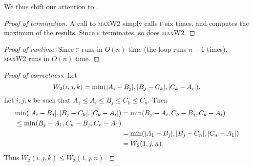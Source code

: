 \documentclass[12pt]{article}
\begin{document}
\begin{solution}
\begin{enumerate}[wide]
            We thus shift our attention to .
            \begin{proof}[Proof of termination]
                A call to \textsc{maxW2} simply calls \textsc{f} six times, and
                computes the maximum of the results.
                Since \textsc{f} terminates, so does \textsc{maxW2}.
            \end{proof}
            \begin{proof}[Proof of runtime]
                Since \textsc{f} runs in $O(n)$ time (the loop runs $n - 1$ times),
                \textsc{maxW2} runs in $O(n)$ time.
            \end{proof}
            \begin{proof}[Proof of correctness]
                Let \[
                    W_2(i, j, k) = \min(\abs{A_{i} - B_{j}}, \abs{B_{j} - C_{k}}, \abs{C_{k} - A_{i}}).
                \]
                Let $i, j, k$ be such that $A_1 \leq A_{i} \leq B_{j} \leq C_{k} \leq C_{n}$.
                Then
                \begin{align*}
                    \min(\abs{A_{i} - B_{j}}, \abs{B_{j} - C_{k}}, \abs{C_{k} - A_{i}})
                        &= \min(B_{j} - A_{i}, C_{k} - B_{j}, C_{k} - A_{i}) \\
                        \leq \min(B_{j} - A_1, C_{n} - B_{j}, C_{n} - A_1) \\
                        &= \min(\abs{A_1 - B_{j}}, \abs{B_{j} - C_{n}}, \abs{C_{n} - A_1}) \\
                        &= W_2(1, j, n)
                \end{align*}
                Thus $W_2(i, j, k) \leq W_2(1, j, n)$.


\end{proof}
\end{enumerate}
\end{solution}
\end{document}
